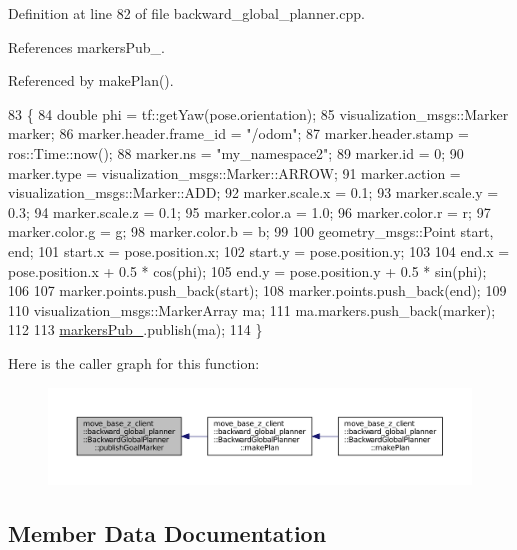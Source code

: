 Definition at line 82 of file backward\+\_\+global\+\_\+planner.\+cpp.



References markers\+Pub\+\_\+.



Referenced by make\+Plan().


\begin{DoxyCode}
83 \{
84     \textcolor{keywordtype}{double} phi = tf::getYaw(pose.orientation);
85     visualization\_msgs::Marker marker;
86     marker.header.frame\_id = \textcolor{stringliteral}{"/odom"};
87     marker.header.stamp = ros::Time::now();
88     marker.ns = \textcolor{stringliteral}{"my\_namespace2"};
89     marker.id = 0;
90     marker.type = visualization\_msgs::Marker::ARROW;
91     marker.action = visualization\_msgs::Marker::ADD;
92     marker.scale.x = 0.1;
93     marker.scale.y = 0.3;
94     marker.scale.z = 0.1;
95     marker.color.a = 1.0;
96     marker.color.r = r;
97     marker.color.g = g;
98     marker.color.b = b;
99 
100     geometry\_msgs::Point start, end;
101     start.x = pose.position.x;
102     start.y = pose.position.y;
103 
104     end.x = pose.position.x + 0.5 * cos(phi);
105     end.y = pose.position.y + 0.5 * sin(phi);
106 
107     marker.points.push\_back(start);
108     marker.points.push\_back(end);
109 
110     visualization\_msgs::MarkerArray ma;
111     ma.markers.push\_back(marker);
112 
113     \hyperlink{classmove__base__z__client_1_1backward__global__planner_1_1BackwardGlobalPlanner_a52a247da9267a83e51679d41e09f11a4}{markersPub\_}.publish(ma);
114 \}
\end{DoxyCode}


Here is the caller graph for this function\+:
\nopagebreak
\begin{figure}[H]
\begin{center}
\leavevmode
\includegraphics[width=350pt]{classmove__base__z__client_1_1backward__global__planner_1_1BackwardGlobalPlanner_adefb1127aa2a4f9c487763aea3817864_icgraph}
\end{center}
\end{figure}




\subsection{Member Data Documentation}
